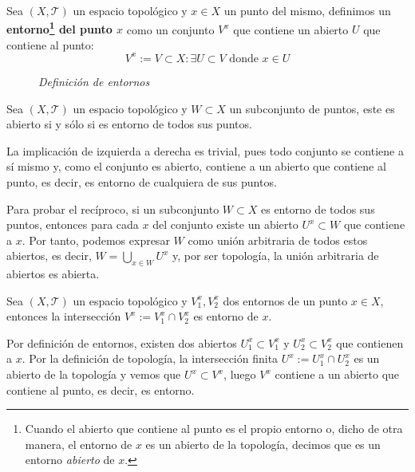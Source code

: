 \begin{defi}[Entorno]
Sea $(X, \mathcal{T})$ un espacio topológico y $x\in X$ un punto del mismo, definimos un \textbf{entorno\footnote{Cuando el abierto que contiene al punto es el propio entorno o, dicho de otra manera, el entorno de $x$ es un abierto de la topología, decimos que es un entorno \textit{abierto} de $x$.} del punto $x$} como un conjunto $V^x$ que contiene un abierto $U$ que contiene al punto:
\[
V^x := V\subset X : \exists U \subset V \text{ donde }x\in U
\]
\end{defi}

\begin{figure}[H]
    \centering
    \caption{\textit{Definición de entornos}}
    \label{fig:definición-entornos}
\end{figure}

\begin{prop}
Sea $(X, \mathcal{T})$ un espacio topológico y $W \subset X$ un subconjunto de puntos, este es abierto si y sólo si es entorno de todos sus puntos.
\end{prop}
\begin{demo}
La implicación de izquierda a derecha es trivial, pues todo conjunto se contiene a sí mismo y, como el conjunto es abierto, contiene a un abierto que contiene al punto, es decir, es entorno de cualquiera de sus puntos.

Para probar el recíproco, si un subconjunto $W\subset X$ es entorno de todos sus puntos, entonces para cada $x$ del conjunto existe un abierto $U^x\subset W$ que contiene a $x$. Por tanto, podemos expresar $W$ como unión arbitraria de todos estos abiertos, es decir, $W = \bigcup_{x\in W} U^x$ y, por ser topología, la unión arbitraria de abiertos es abierta.
\end{demo}

\begin{prop}
Sea $(X,\mathcal{T})$ un espacio topológico y $V_1^x, V_2^x$ dos entornos de un punto $x\in X$, entonces la intersección $V^x := V_1^x\cap V_2^x$ es entorno de $x$.
\end{prop}
\begin{demo}
Por definición de entornos, existen dos abiertos $U_1^x\subset V_1^x$ y $U_2^x\subset V_2^x$ que contienen a $x$. Por la definición de topología, la intersección finita $U^x := U_1^x\cap U_2^x$ es un abierto de la topología y vemos que $U^x \subset V^x$, luego $V^x$ contiene a un abierto que contiene al punto, es decir, es entorno.
\end{demo}

